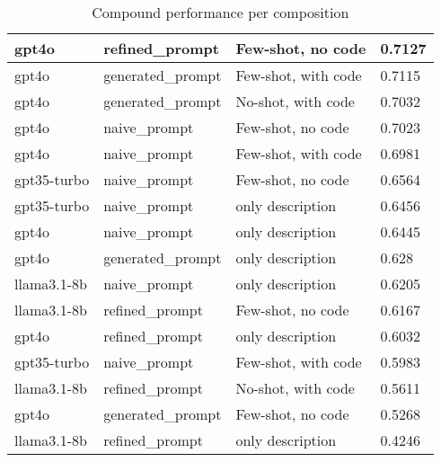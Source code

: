 \documentclass[a4paper,11pt,oneside]{memoir}
\begin{document}
\begin{table}[!ht]
\begin{tabular}{|l|l|l|l|}
        gpt4o &  refined\_prompt &  Few-shot, no code & 0.7127 \\ \hline
        gpt4o &  generated\_prompt &  Few-shot, with code & 0.7115 \\ \hline
        gpt4o &  generated\_prompt &  No-shot, with code & 0.7032 \\ \hline
        gpt4o &  naive\_prompt &  Few-shot, no code & 0.7023 \\ \hline
        gpt4o &  naive\_prompt &  Few-shot, with code & 0.6981 \\ \hline
        gpt35-turbo &  naive\_prompt &  Few-shot, no code & 0.6564 \\ \hline
        gpt35-turbo &  naive\_prompt &  only description & 0.6456 \\ \hline
        gpt4o &  naive\_prompt &  only description & 0.6445 \\ \hline
        gpt4o &  generated\_prompt &  only description & 0.628 \\ \hline
        llama3.1-8b &  naive\_prompt &  only description & 0.6205 \\ \hline
        llama3.1-8b &  refined\_prompt &  Few-shot, no code & 0.6167 \\ \hline
        gpt4o &  refined\_prompt &  only description & 0.6032 \\ \hline
        gpt35-turbo &  naive\_prompt &  Few-shot, with code & 0.5983 \\ \hline
        llama3.1-8b &  refined\_prompt &  No-shot, with code & 0.5611 \\ \hline
        gpt4o &  generated\_prompt &  Few-shot, no code & 0.5268 \\ \hline
        llama3.1-8b &  refined\_prompt &  only description & 0.4246 \\ \hline
    \end{tabular}
    \label{table:compound_per_composition}
    \caption{Compound performance per composition}
\end{table}
\backmatter
\printglossaries
\printbibliography[heading=bibintoc]
\end{document}

